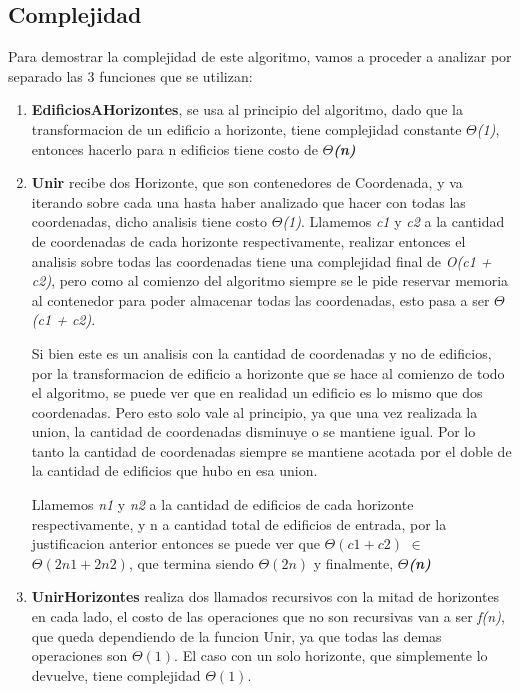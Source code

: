 \newpage
\subsection{Complejidad}
Para demostrar la complejidad de este algoritmo, vamos a proceder a analizar por separado las 3 funciones que se utilizan:
\begin{enumerate}
\bigskip
\item \textbf{EdificiosAHorizontes}, se usa al principio del algoritmo, dado que la transformacion de un edificio a horizonte, tiene complejidad constante $\Theta$\textit{(1)}, entonces hacerlo para n edificios tiene costo de \textbf{$\Theta$\textit{(n)}}\bigskip
\item \textbf{Unir} recibe dos Horizonte, que son contenedores de Coordenada, y va iterando sobre cada una hasta haber analizado que hacer con todas las coordenadas, dicho analisis tiene costo $\Theta$\textit{(1)}. Llamemos \textit{c1} y \textit{c2} a la cantidad de coordenadas de cada horizonte respectivamente, realizar entonces el analisis sobre todas las coordenadas tiene una complejidad final de \textit{O(c1 + c2)}, pero como al comienzo del algoritmo siempre se le pide reservar memoria al contenedor para poder almacenar todas las coordenadas, esto pasa a ser $\Theta$\textit{(c1 + c2)}.

Si bien este es un analisis con la cantidad de coordenadas y no de edificios, por la transformacion de edificio a horizonte que se hace al comienzo de todo el algoritmo, se puede ver que en realidad un edificio es lo mismo que dos coordenadas. Pero esto solo vale al principio, ya que una vez realizada la union, la cantidad de coordenadas disminuye o se mantiene igual. Por lo tanto la cantidad de coordenadas siempre se mantiene acotada por el doble de la  cantidad de edificios que hubo en esa union.

Llamemos \textit{n1} y \textit{n2} a la cantidad de edificios de cada horizonte respectivamente, y n a cantidad total de edificios de entrada, por la justificacion anterior entonces se puede ver que \textit{$\Theta(c1 + c2)$} $\in$ \textit{$\Theta(2n1 + 2n2)$}, que termina siendo \textit{$\Theta(2n)$} y finalmente, \textit{\textbf{$\Theta$(n)}}
\bigskip
\item \textbf{UnirHorizontes} realiza dos llamados recursivos con la mitad de horizontes en cada lado, el costo de las operaciones que no son recursivas van a ser \textit{f(n)}, que queda dependiendo de la funcion Unir, ya que todas las demas operaciones son $\Theta(1)$. El caso con un solo horizonte, que simplemente lo devuelve, tiene complejidad $\Theta(1)$.


\end{enumerate}
